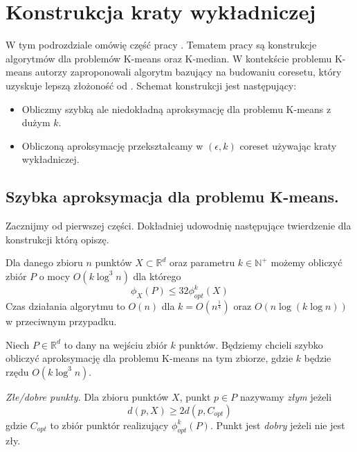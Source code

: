 \section{Konstrukcja kraty wykładniczej}

W tym podrozdziale omówię część pracy \cite{10.1145/1007352.1007400}.
Tematem pracy są konstrukcje algorytmów dla problemów K-means oraz K-median.
W kontekście problemu K-means autorzy zaproponowali algorytm bazujący na budowaniu coresetu, który uzyskuje lepszą złożoność od \cite{Matousek99onapproximate}.
Schemat konstrukcji jest następujący:
\begin{itemize}
    \item Obliczmy szybką ale niedokładną aproksymację dla problemu K-means z dużym $k$.
    \item Obliczoną aproksymację przekształcamy w $(\epsilon, k)$ coreset używając kraty wykładniczej.
\end{itemize}


\subsection{Szybka aproksymacja dla problemu K-means.}
\noindent
Zacznijmy od pierwszej części.
Dokładniej udowodnię następujące twierdzenie dla konstrukcji którą opiszę.

\begin{thm}
    Dla danego zbioru $n$ punktów $X \subset \mathbb{R}^d$ oraz parametru $k \in \mathbb{N}^{+}$ możemy 
    obliczyć zbiór $P$ o mocy $O(k \log^{3}n)$ dla którego 
    \begin{equation}
        \phi_{X}(P) \leq 32 \phi_{opt}^{k}(X)
    \end{equation}
    Czas działania algorytmu to $O(n)$ dla $k = O(n^{\frac{1}{4}})$ oraz $O(n \log (k \log n))$ w przeciwnym przypadku.
\end{thm}


\noindent
Niech $P \in \mathbb{R}^{d}$ to dany na wejściu zbiór $k$ punktów.
Będziemy chcieli szybko obliczyć aproksymację dla problemu K-means na tym zbiorze, gdzie $k$ będzie rzędu $O(k \log^{3}n)$.

\begin{definition}
    \emph{Złe/dobre punkty.} Dla zbioru punktów $X$, punkt $p \in P$ nazywamy \textit{złym} jeżeli
    \begin{equation}
        d(p, X) \geq 2d(p, C_{opt})
    \end{equation}
    gdzie $C_{opt}$ to zbiór punktór realizujący $\phi_{opt}^{k}(P)$.
    Punkt jest \textit{dobry} jeżeli nie jest zły.
\end{definition}

